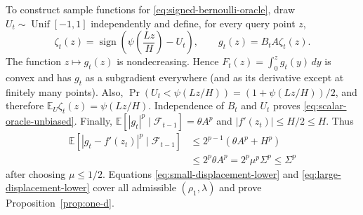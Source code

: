 \documentclass[11pt,letterpaper]{article}
\theoremstyle{definition}
\newcommand{\E}{\mathbb E}
\newcommand{\F}{\mathcal F}
\begin{document}
To construct sample functions for \eqref{eq:signed-bernoulli-oracle},
draw $U_t\sim\operatorname{Unif}[-1,1]$ independently and define, for every
query point $z$,
\begin{equation}
\zeta_t(z)=\operatorname{sign}(\psi\left(\frac{Lz}{H}\right)-U_t),
\qquad
g_t(z)=B_tA \zeta_t(z).
\label{eq:scalar-sample-gradient}
\end{equation}
The function $z\mapsto g_t(z)$ is nondecreasing.  Hence
$F_t(z)=\int_0^zg_t(y)\,dy$ is convex and has $g_t$ as a subgradient
everywhere (and as its derivative except at finitely many points).
Also, $\Pr(U_t<\psi(Lz/H))=(1+\psi(Lz/H))/2$, and therefore
$\E_U \zeta_t(z)=\psi(Lz/H)$.
Independence of $B_t$ and $U_t$ proves \eqref{eq:scalar-oracle-unbiased}.
Finally, $\E[|g_t|^p\mid\F_{t-1}]=\theta A^p$ and
$|f'(z_t)|\le H/2\le H$. Thus
\begin{align}
\E[|g_t-f'(z_t)|^p\mid\F_{t-1}]
&\le2^{p-1}\left(\theta A^p+H^p\right)\\
&\le2^p\theta A^p
=2^p\mu^p\Sigma^p
\le\Sigma^p
\label{eq:scalar-oracle-moment}
\end{align}
after choosing $\mu\le1/2$.
Equations \eqref{eq:small-displacement-lower} and
\eqref{eq:large-displacement-lower} cover all
admissible $(\rho_1,\lambda)$ and prove
Proposition~\ref{prop:one-d}.
\end{document}
